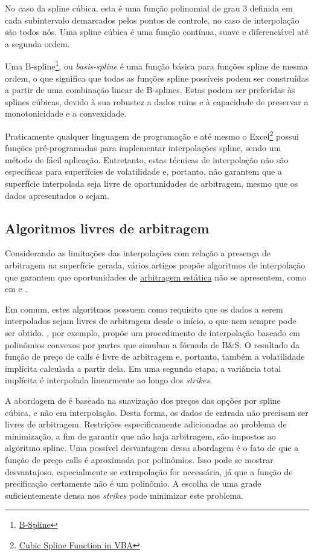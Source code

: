 \documentclass[]{book}
\let\rmarkdownfootnote\footnote%
\def\footnote{\protect\rmarkdownfootnote}
\theoremstyle{definition}
\theoremstyle{definition}
\theoremstyle{definition}
\theoremstyle{remark}
\begin{document}
No caso da spline cúbica, esta é uma função polinomial de grau 3
definida em cada subintervalo demarcados pelos pontos de controle, no
caso de interpolação são todos nós. Uma spline cúbica é uma função
contínua, suave e diferenciável até a segunda ordem.

Uma B-spline\footnote{\href{https://en.wikipedia.org/wiki/B-spline}{B-Spline}},
ou \emph{basis-spline} é uma função básica para funções spline de mesma
ordem, o que significa que todas as funções spline possíveis podem ser
construídas a partir de uma combinação linear de B-splines. Estas podem
ser preferidas às splines cúbicas, devido à sua robustez a dados ruins e
à capacidade de preservar a monotonicidade e a convexidade.

Praticamente qualquer linguagem de programação e até mesmo o
Excel\footnote{\href{https://www.business-spreadsheets.com/forum.asp?t=120}{Cubic
  Spline Function in VBA}} possui funções pré-programadas para
implementar interpolações spline, sendo um método de fácil aplicação.
Entretanto, estas técnicas de interpolação não são específicas para
superfícies de volatilidade e, portanto, não garantem que a superfície
interpolada seja livre de oportunidades de arbitragem, mesmo que os
dados apresentados o sejam.

\subsection{Algoritmos livres de
arbitragem}\label{algoritmos-livres-de-arbitragem}

Considerando as limitações das interpolações com relação a presença de
arbitragem na superfície gerada, vários artigos propõe algoritmos de
interpolação que garantem que oportunidades de
\protect\hyperlink{arbestatica}{arbitragem estática} não se apresentem,
como em \citet{Kahale2004} e \citet{Wang2004}.

Em comum, estes algoritmos possuem como requisito que os dados a serem
interpolados sejam livres de arbitragem desde o início, o que nem sempre
pode ser obtido. \citet{Kahale2004}, por exemplo, propõe um procedimento
de interpolação baseado em polinômios convexos por partes que simulam a
fórmula de B\&S. O resultado da função de preço de calls é livre de
arbitragem e, portanto, também a volatilidade implícita calculada a
partir dela. Em uma segunda etapa, a variância total implícita é
interpolada linearmente ao longo dos \emph{strikes}.

A abordagem de \citet{Fengler2012} é baseada na suavização dos preços
das opções por spline cúbica, e não em interpolação. Desta forma, os
dados de entrada não precisam ser livres de arbitragem. Restrições
especificamente adicionadas ao problema de minimização, a fim de
garantir que não haja arbitragem, são impostos ao algoritmo spline. Uma
possível desvantagem dessa abordagem é o fato de que a função de preço
calls é aproximada por polinômios. Isso pode se mostrar desvantajoso,
especialmente se extrapolação for necessária, já que a função de
precificação certamente não é um polinômio. A escolha de uma grade
suficientemente densa nos \emph{strikes} pode minimizar este problema.
\end{document}
